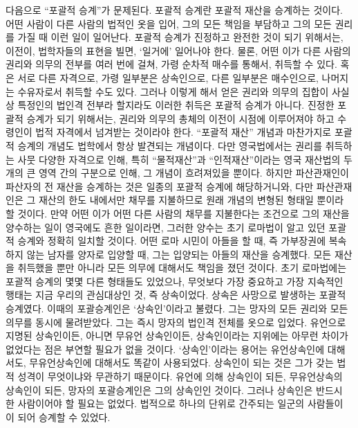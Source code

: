 다음으로 ``포괄적 승계''가 문제된다.
포괄적 승계란 포괄적 재산을 승계하는 것이다.
어떤 사람이 다른 사람의 법적인 옷을 입어,
그의 모든 책임을 부담하고 그의 모든 권리를 가질 때 이런 일이 일어난다.
포괄적 승계가 진정하고 완전한 것이 되기 위해서는,
이전이,
법학자들의 표현을 빌면, `일거에'
일어나야 한다.
물론, 어떤 이가 다른 사람의 권리와 의무의 전부를 여러 번에 걸쳐,
가령 순차적 매수를 통해서, 취득할 수 있다.
혹은 서로 다른 자격으로, 가령 일부분은 상속인으로,
다른 일부분은 매수인으로, 나머지는 수유자로서 취득할 수도 있다.
그러나 이렇게 해서 얻은 권리와 의무의 집합이 사실상 특정인의 법인격 전부라
할지라도 이러한 취득은 포괄적 승계가 아니다.
진정한 포괄적 승계가 되기 위해서는,
권리와 의무의 총체의 이전이  시점에 이루어져야 하고
수령인이  법적 자격에서 넘겨받는 것이라야 한다.
``포괄적 재산'' 개념과 마찬가지로 포괄적 승계의 개념도
법학에서 항상 발견되는 개념이다.
다만 영국법에서는 권리를 취득하는 사뭇 다양한 자격으로 인해,
특히 ``물적재산''과 ``인적재산''이라는
영국 재산법의 두 개의 큰 영역 간의 구분으로 인해, 그 개념이 흐려져있을 뿐이다.
하지만 파산관재인이 파산자의 전 재산을 승계하는 것은
일종의 포괄적 승계에 해당하거니와,
다만
파산관재인은 그 재산의 한도 내에서만 채무를 지불하므로
원래 개념의 변형된 형태일 뿐이라 할 것이다.
만약 어떤 이가 어떤 다른 사람의  채무를 지불한다는 조건으로
그의  재산을 양수하는 일이 영국에도 흔한 일이라면,
그러한 양수는 초기 로마법이 알고 있던 포괄적 승계와 정확히 일치할 것이다.
어떤 로마 시민이 아들을
할 때,
즉 가부장권에 복속하지 않는 남자를 양자로 입양할 때,
그는 입양되는 아들의 재산을  승계했다.
모든 재산을 취득했을 뿐만 아니라 모든 의무에 대해서도 책임을 졌던 것이다.
초기 로마법에는 포괄적 승계의 몇몇 다른 형태들도 있었으나,
무엇보다 가장 중요하고 가장 지속적인 행태는 지금 우리의 관심대상인 것,
즉 상속이었다.
상속은 사망으로 발생하는 포괄적 승계였다.
이때의 포괄승계인은 `상속인'이라고 불렸다.
그는 망자의 모든 권리와 모든 의무를 동시에 물려받았다.
그는 즉시 망자의 법인격 전체를 옷으로 입었다.
유언으로 지명된 상속인이든, 아니면
무유언 상속인이든, 상속인이라는 지위에는 아무런 차이가 없었다는 점은
부연할 필요가 없을 것이다.
`상속인'이라는 용어는 유언상속인에 대해서도, 무유언상속인에 대해서도
똑같이 사용되었다.
상속인이 되는 것은 그가 갖는 법적 성격이 무엇이냐와
무관하기 때문이다.
유언에 의해 상속인이 되든, 무유언상속의 상속인이 되든,
망자의 포괄승계인은 그의 상속인인 것이다.
그러나 상속인은 반드시 한 사람이어야 할 필요는 없었다.
법적으로 하나의 단위로 간주되는 일군의 사람들이
이 되어 승계할 수 있었다.

